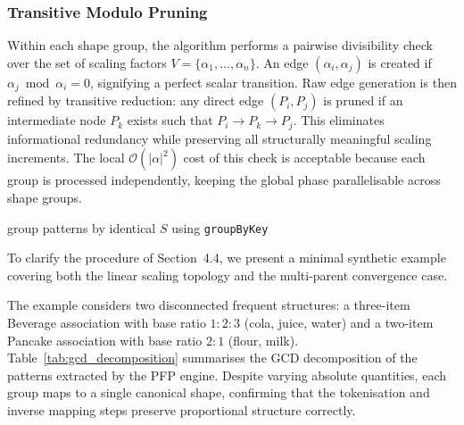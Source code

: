 \documentclass[10pt, twocolumn]{article}
\begin{document}
\subsubsection{Transitive Modulo Pruning}

Within each shape group, the algorithm performs a pairwise divisibility check
over the set of scaling factors $V = \{\alpha_1, \dots, \alpha_n\}$. An edge
$(\alpha_i, \alpha_j)$ is created if $\alpha_j \bmod \alpha_i = 0$,
signifying a perfect scalar transition. Raw edge generation is then refined
by transitive reduction: any direct edge $(P_i, P_j)$ is pruned if an
intermediate node $P_k$ exists such that $P_i \rightarrow P_k \rightarrow
P_j$. This eliminates informational redundancy while preserving all
structurally meaningful scaling increments. The local
$\mathcal{O}(|\alpha|^2)$ cost of this check is acceptable because each
group is processed independently, keeping the global phase parallelisable
across shape groups.

\begin{algorithm}[H]
    \caption{Proportional Graph Construction with Transitive Modulo Pruning}

    group patterns by identical $S$ using \texttt{groupByKey}\;
    \;
\end{algorithm}

To clarify the procedure of Section~4.4, we present a minimal synthetic
example covering both the linear scaling topology and the multi-parent
convergence case.

The example considers two disconnected frequent structures: a three-item
Beverage association with base ratio $1{:}2{:}3$ (cola, juice, water) and a
two-item Pancake association with base ratio $2{:}1$ (flour, milk).
Table~\ref{tab:gcd_decomposition} summarises the GCD decomposition of the
patterns extracted by the PFP engine. Despite varying absolute quantities,
each group maps to a single canonical shape, confirming that the tokenisation
and inverse mapping steps preserve proportional structure correctly.
\end{document}
